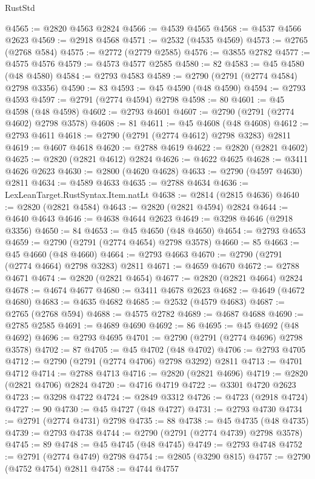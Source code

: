 \begin{lexlean}{RustStd}
\begin{coremodule}
@4565 := @2820 @4563 @2824
@4566 := @4539 @4565
@4568 := @4537 @4566 @2623
@4569 := @2918 @4568
@4571 := @2532 (@4535 @4569)
@4573 := @2765 (@2768 @584)
@4575 := @2772 (@2779 @2585)
@4576 := @3855 @2782
@4577 := @4575 @4576
@4579 := @4573 @4577 @2585
@4580 := 82
@4583 := @45 @4580 (@48 @4580)
@4584 := @2793 @4583
@4589 := @2790 (@2791 (@2774 @4584) @2798 @3356)
@4590 := 83
@4593 := @45 @4590 (@48 @4590)
@4594 := @2793 @4593
@4597 := @2791 (@2774 @4594) @2798
@4598 := 80
@4601 := @45 @4598 (@48 @4598)
@4602 := @2793 @4601
@4607 := @2790 (@2791 (@2774 @4602) @2798 @3578)
@4608 := 81
@4611 := @45 @4608 (@48 @4608)
@4612 := @2793 @4611
@4618 := @2790 (@2791 (@2774 @4612) @2798 @3283) @2811
@4619 := @4607 @4618
@4620 := @2788 @4619
@4622 := @2820 (@2821 @4602)
@4625 := @2820 (@2821 @4612) @2824
@4626 := @4622 @4625
@4628 := @3411 @4626 @2623
@4630 := @2800 (@4620 @4628)
@4633 := @2790 (@4597 @4630) @2811
@4634 := @4589 @4633
@4635 := @2788 @4634
@4636 := LexLeanTarget.RustSyntax.Item.natLt
@4638 := @2814 (@2815 @4636)
@4640 := @2820 (@2821 @4584)
@4643 := @2820 (@2821 @4594) @2824
@4644 := @4640 @4643
@4646 := @4638 @4644 @2623
@4649 := @3298 @4646 (@2918 @3356)
@4650 := 84
@4653 := @45 @4650 (@48 @4650)
@4654 := @2793 @4653
@4659 := @2790 (@2791 (@2774 @4654) @2798 @3578)
@4660 := 85
@4663 := @45 @4660 (@48 @4660)
@4664 := @2793 @4663
@4670 := @2790 (@2791 (@2774 @4664) @2798 @3283) @2811
@4671 := @4659 @4670
@4672 := @2788 @4671
@4674 := @2820 (@2821 @4654)
@4677 := @2820 (@2821 @4664) @2824
@4678 := @4674 @4677
@4680 := @3411 @4678 @2623
@4682 := @4649 (@4672 @4680)
@4683 := @4635 @4682
@4685 := @2532 (@4579 @4683)
@4687 := @2765 (@2768 @594)
@4688 := @4575 @2782
@4689 := @4687 @4688
@4690 := @2785 @2585
@4691 := @4689 @4690
@4692 := 86
@4695 := @45 @4692 (@48 @4692)
@4696 := @2793 @4695
@4701 := @2790 (@2791 (@2774 @4696) @2798 @3578)
@4702 := 87
@4705 := @45 @4702 (@48 @4702)
@4706 := @2793 @4705
@4712 := @2790 (@2791 (@2774 @4706) @2798 @3292) @2811
@4713 := @4701 @4712
@4714 := @2788 @4713
@4716 := @2820 (@2821 @4696)
@4719 := @2820 (@2821 @4706) @2824
@4720 := @4716 @4719
@4722 := @3301 @4720 @2623
@4723 := @3298 @4722
@4724 := @2849 @3312
@4726 := @4723 (@2918 @4724)
@4727 := 90
@4730 := @45 @4727 (@48 @4727)
@4731 := @2793 @4730
@4734 := @2791 (@2774 @4731) @2798
@4735 := 88
@4738 := @45 @4735 (@48 @4735)
@4739 := @2793 @4738
@4744 := @2790 (@2791 (@2774 @4739) @2798 @3578)
@4745 := 89
@4748 := @45 @4745 (@48 @4745)
@4749 := @2793 @4748
@4752 := @2791 (@2774 @4749) @2798
@4754 := @2805 (@3290 @815)
@4757 := @2790 (@4752 @4754) @2811
@4758 := @4744 @4757

\end{coremodule}
\end{lexlean}
